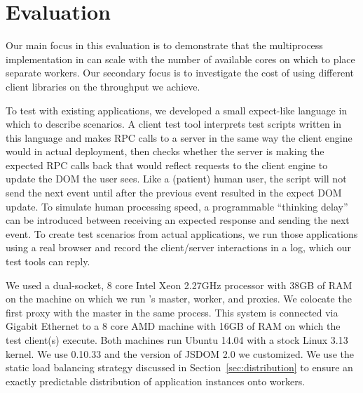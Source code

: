 \section{Evaluation}
\label{sec:eval}

Our main focus in this evaluation is to demonstrate that the multiprocess implementation
in \cbtwo can scale with the number of available cores on which to place separate workers.
Our secondary focus is to investigate the cost of using different client libraries on 
the throughput we achieve.

To test \cbtwo with existing applications, we developed a small expect-like language 
in which to describe scenarios. A client test tool interprets test scripts written in
this language and makes RPC calls to a server in the same way the client engine would
in actual deployment, then checks whether the server is making the expected RPC
calls back that would reflect requests to the client engine to update the DOM the
user sees.  
Like a (patient) human user, the script will not send the next event until after the
previous event resulted in the expect DOM update.  
To simulate human processing speed, a programmable ``thinking delay'' can be introduced 
between receiving an expected response and sending the next event.
To create test scenarios from actual applications,
we run those applications using a real browser and record the client/server interactions
in a log, which our test tools can reply.

We used a dual-socket, 8 core Intel Xeon 2.27GHz processor with 38GB of RAM on the machine
on which we run \cbtwo{}'s master, worker, and proxies.  We colocate the first proxy with
the master in the same process.
This system is connected via Gigabit Ethernet to a 8 core AMD
machine with 16GB of RAM on which the test client(s) execute. Both machines run 
Ubuntu 14.04 with a stock Linux 3.13 kernel.  We use \nodejs{} 0.10.33 and the version
of JSDOM 2.0 we customized.  We use the static load balancing strategy discussed in 
Section~\ref{sec:distribution} to ensure an exactly predictable distribution of application
instances onto workers.

%
%

